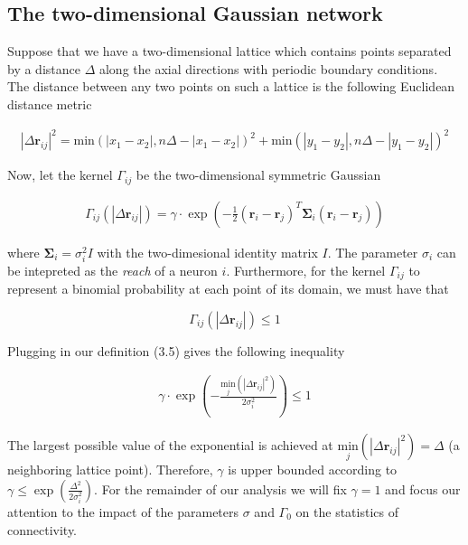\documentclass{ucetd}
\begin{document}
\subsection{The two-dimensional Gaussian network}

Suppose that we have a two-dimensional lattice which contains points separated by a distance $\Delta$ along the axial directions with periodic boundary conditions. The distance between any two points on such a lattice is the following Euclidean distance metric

\begin{align*}
|\Delta\mathbf{r}_{ij}|^{2} = \mathrm{min}(|x_1 - x_2|, n\Delta - |x_1 - x_2|)^2 + \mathrm{min}(|y_1 - y_2|, n\Delta - |y_1 - y_2|)^2
\end{align*}

Now, let the kernel $\Gamma_{ij}$ be the two-dimensional symmetric Gaussian

\begin{align}
\Gamma_{ij}(|\Delta\mathbf{r}_{ij}|) = \gamma\cdot \exp\left(-\frac{1}{2}(\mathbf{r}_{i}-\mathbf{r}_{j})^{T}\mathbf{\Sigma}_{i}(\mathbf{r}_{i}-\mathbf{r}_{j})\right)
\end{align}

where $\mathbf{\Sigma}_{i} = \sigma_{i}^{2}I$ with the two-dimesional identity matrix $I$. The parameter $\sigma_{i}$ can be intepreted as the \emph{reach} of a neuron $i$. Furthermore, for the kernel $\Gamma_{ij}$ to represent a binomial probability at each point of its domain, we must have that


\begin{equation}
\Gamma_{ij}(|\Delta\mathbf{r}_{ij}|)  \leq 1
\end{equation}

Plugging in our definition (3.5) gives the following inequality

\begin{align*}
\gamma\cdot \exp\left(-\frac{\underset{j}{\mathrm{min}}\left(|\Delta\mathbf{r}_{ij}|^{2}\right)}{2\sigma_{i}^{2}} \right) \leq 1
\end{align*}

The largest possible value of the exponential is achieved at $\underset{j}{\mathrm{min}}\left(|\Delta\mathbf{r}_{ij}|^{2}\right) = \Delta$ (a neighboring lattice point). Therefore, $\gamma$ is upper bounded according to $\gamma \leq \exp\left(\frac{\Delta^{2}}{2\sigma_{i}^{2}}\right)$. For the remainder of our analysis we will fix $\gamma = 1$ and focus our attention to the impact of the parameters $\sigma$ and $\Gamma_{0}$ on the statistics of connectivity. 
\end{document}
